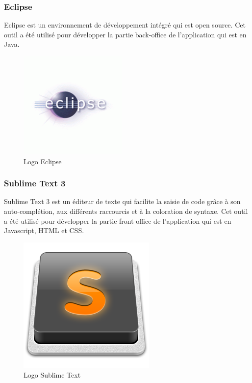 \subsubsection{Eclipse}
\noindent\begin{minipage}{0.69\textwidth}
Eclipse est un environnement de développement intégré qui est open source. Cet outil a été utilisé pour développer la partie back-office \footnotemark de l'application qui est en Java.
\end{minipage}
\begin{minipage}{0.3\textwidth}
\begin{figure}[H]
  \centering
  \includegraphics[scale=0.6]{figures/logo/eclipse.png}
  \caption{Logo Eclipse}
  \label{code21}
\end{figure}
\end{minipage}
\subsubsection{Sublime Text 3}
\noindent\begin{minipage}{0.69\textwidth}
Sublime Text 3 est un éditeur de texte qui facilite la saisie de code grâce à son auto-complétion, aux différents raccourcis et à la coloration de syntaxe. Cet outil a été utilisé pour développer la partie front-office \footnotemark de l'application qui est en Javascript, HTML et CSS.
\end{minipage}
\begin{minipage}{0.3\textwidth}
\begin{figure}[H]
  \centering
  \includegraphics[scale=0.25]{figures/logo/Sublime_Text_3.png}
  \caption{Logo Sublime Text}
  \label{code22}
\end{figure}
\end{minipage}

